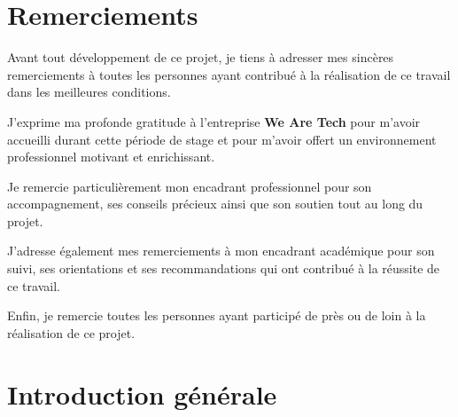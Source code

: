 \documentclass[a4paper,12pt]{report}
\begin{document}

\chapter*{Remerciements}


Avant tout développement de ce projet, je tiens à adresser mes sincères remerciements à toutes les personnes ayant contribué à la réalisation de ce travail dans les meilleures conditions.

J'exprime ma profonde gratitude à l'entreprise \textbf{We Are Tech} pour m'avoir accueilli durant cette période de stage et pour m'avoir offert un environnement professionnel motivant et enrichissant.

Je remercie particulièrement mon encadrant professionnel pour son accompagnement, ses conseils précieux ainsi que son soutien tout au long du projet.

J'adresse également mes remerciements à mon encadrant académique pour son suivi, ses orientations et ses recommandations qui ont contribué à la réussite de ce travail.

Enfin, je remercie toutes les personnes ayant participé de près ou de loin à la réalisation de ce projet.

\newpage


\tableofcontents

\newpage


\listoffigures

\newpage


\listoftables

\newpage


\chapter*{Introduction générale}
\end{document}
